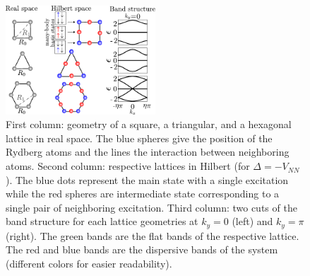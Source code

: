 \documentclass[prl,aps,twocolumn,showpacs,superscriptaddress,longbibliography]{revtex4-1}
\begin{document}
\begin{figure}
% 	    

	      \includegraphics[width=0.5\textwidth]{graphics/lattices_real_hilbert_bands.pdf}

		\caption{
		    First column: geometry of a square, a triangular, and a hexagonal lattice 
		    in real space. The blue spheres give the position of the Rydberg atoms and
		    the lines the interaction between neighboring atoms. Second column: respective lattices in Hilbert 
		    (for $\Delta = -V_{NN}$). The blue dots represent the main state with a single excitation while the red spheres
		    are intermediate state corresponding to a single pair of neighboring excitation.
		    Third column: two cuts of the band structure for each lattice geometries at $k_y= 0$ (left) and $k_y = \pi$ (right).
		    The green bands are the flat bands of the respective lattice. The red and blue bands are the dispersive bands of the system
		    (different colors for easier readability).
                    }
  
	\label{Fig:flat_band_lattices}
\end{figure} 
\end{document}
